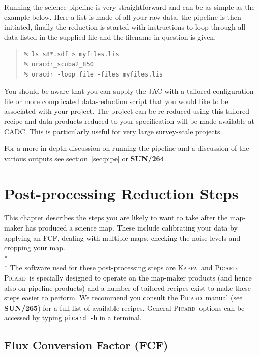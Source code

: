 \documentclass[twoside,11pt]{article}
\newcommand{\htmlref}[2]{#1}
\newcommand{\latexhtml}[2]{#1}
\newcommand{\xref}[3]{#1}
\newcommand{\xlabel}[1]{}
\renewcommand{\_}{\texttt{\symbol{95}}}
\newenvironment{myquote}{\begin{quote}\begin{small}}{\end{small}\end{quote}}
\newcommand{\Kappa}{\xref{\textsc{Kappa}}{sun95}{}}
\newcommand{\picard}{\xref{\textsc{Picard}}{sun265}{}}
\newcommand{\picardsun}{\xref{\textbf{SUN/265}}{sun265}{}}
\newcommand{\pipelinesun}{\xref{\textbf{SUN/264}}{sun264}{}}
\newcommand{\cref}[3]{\latexhtml{#1~\ref{#2}}{\htmlref{#3}{#2}}}
\begin{document}
Running the science pipeline is very straightforward and can be as
simple as the example below. Here a list is made of all your raw data,
the pipeline is then initiated, finally the reduction is started with
instructions to loop through all data listed in the supplied file and
the filename in question is given.

\begin{myquote}
\begin{verbatim}
% ls s8*.sdf > myfiles.lis
% oracdr_scuba2_850
% oracdr -loop file -files myfiles.lis
\end{verbatim}
\end{myquote}

You should be aware that you can supply the JAC with a tailored
configuration file or more complicated data-reduction script that you
would like to be associated with your project. The project can be
re-reduced using this tailored recipe and data products reduced to
your specification will be made available at CADC. This is
particularly useful for very large survey-scale projects.

For a more in-depth discussion on running the pipeline and a discussion
of the various outputs see \cref{section}{sec:pipe}{The SCUBA-2
Pipeline} or \pipelinesun.
\clearpage

\section{\xlabel{maps}Post-processing Reduction Steps}
\label{sec:postprocess}

This chapter describes the steps you are likely to want to take after
the map-maker has produced a science map. These include calibrating
your data by applying an FCF, dealing with multiple maps, checking the
noise levels and cropping your map.
\\*\\*
The software used for these post-processing steps are \Kappa\ and
\picard. \picard\ is specially designed to operate on the map-maker
products (and hence also on pipeline products) and a number of tailored
recipes exist to make these steps easier to perform. We recommend you
consult the \picard\ manual (see \picardsun) for a full list of
available recipes. General \picard\ options can be accessed by typing
\texttt{picard -h} in a terminal.

\subsection{\xlabel{apply_fcf}Flux Conversion Factor (FCF)}
\label{sec:cmult}
\end{document}
